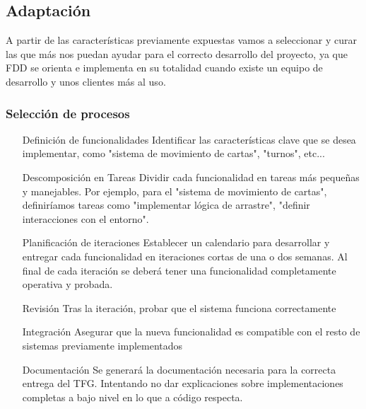 \subsection{Adaptación}

A partir de las características previamente expuestas vamos a seleccionar y curar las que más nos puedan ayudar para el correcto desarrollo del proyecto, ya que FDD se orienta e implementa en su totalidad cuando existe un equipo de desarrollo y unos clientes más al uso.
\subsubsection{Selección de procesos}
\begin{enumerate}
    \item [Definición de funcionalidades]
    Identificar las características clave que se desea implementar, como "sistema de movimiento de cartas", "turnos", etc...
    \item [Descomposición en Tareas] Dividir cada funcionalidad en tareas más pequeñas y manejables. Por ejemplo, para el "sistema de movimiento de cartas", definiríamos tareas como "implementar lógica de arrastre", "definir interacciones con el entorno".
    \item [Planificación de iteraciones] Establecer un calendario para desarrollar y entregar cada funcionalidad en iteraciones cortas de una o dos semanas. Al final de cada iteración se deberá tener una funcionalidad completamente operativa y probada.
    \item [Revisión] Tras la iteración, probar que el sistema funciona correctamente
    \item [Integración] Asegurar que la nueva funcionalidad es compatible con el resto de sistemas previamente implementados
    \item [Documentación]Se generará la documentación necesaria para la correcta entrega del TFG. Intentando no dar explicaciones sobre implementaciones completas a bajo nivel en lo que a código respecta.
\end{enumerate}
